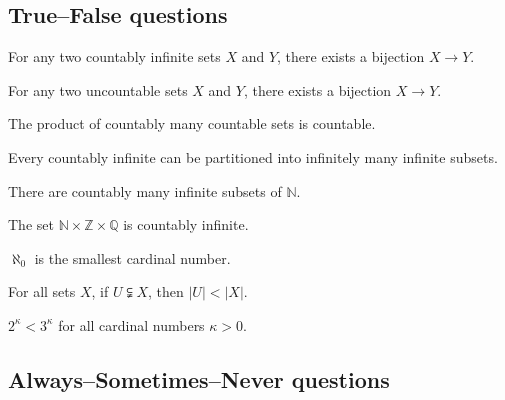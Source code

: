 \subsection*{True--False questions}


\begin{chapex} %
\label{cqInfinityTFBegin}
For any two countably infinite sets $X$ and $Y$, there exists a bijection $X \to Y$.
\end{chapex}

\begin{chapex} %
For any two uncountable sets $X$ and $Y$, there exists a bijection $X \to Y$.
\end{chapex}

\begin{chapex} %
The product of countably many countable sets is countable.
\end{chapex}

\begin{chapex} %
Every countably infinite can be partitioned into infinitely many infinite subsets.
\end{chapex}

\begin{chapex} %
There are countably many infinite subsets of $\mathbb{N}$.
\end{chapex}

\begin{chapex} %
The set $\mathbb{N} \times \mathbb{Z} \times \mathbb{Q}$ is countably infinite.
\end{chapex}

\begin{chapex} %
$\aleph_0$ is the smallest cardinal number.
\end{chapex}

\begin{chapex} %
For all sets $X$, if $U \subsetneqq X$, then $|U| < |X|$.
\end{chapex}

\begin{chapex} %
\label{cqInfinityTFEnd}
$2^{\kappa} < 3^{\kappa}$ for all cardinal numbers $\kappa > 0$.
\end{chapex}

\subsection*{Always--Sometimes--Never questions}

